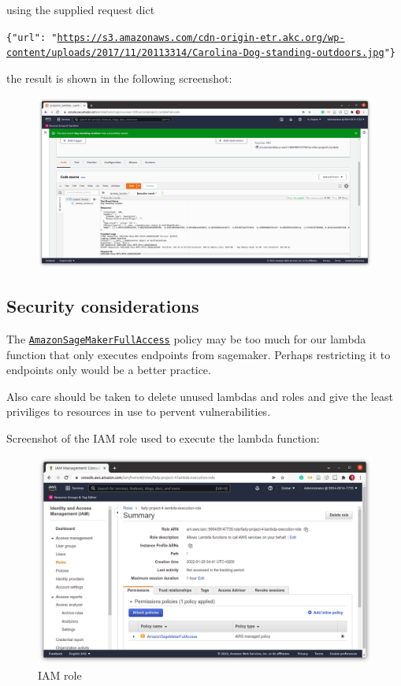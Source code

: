 \documentclass[a4paper
]{article}
\begin{document}
using the supplied request dict


\texttt{\{"url": "\url{https://s3.amazonaws.com/cdn-origin-etr.akc.org/wp-content/uploads/2017/11/20113314/Carolina-Dog-standing-outdoors.jpg}"\}}


the result is shown in the following screenshot:

\begin{figure}[H]
\centering
\includegraphics{../screenshots/04-a_lambda-function-testing.png}
\end{figure}

\hypertarget{security-considerations}{%
\subsection{Security considerations}\label{security-considerations}}

The
\href{https://console.aws.amazon.com/iam/home\#/policies/arn:aws:iam::aws:policy/AmazonSageMakerFullAccess}{\texttt{AmazonSageMakerFullAccess}}
policy may be too much for our lambda function that only executes
endpoints from sagemaker. Perhaps restricting it to endpoints only would
be a better practice.

Also care should be taken to delete unused lambdas and roles and give
the least priviliges to resources in use to pervent vulnerabilities.

Screenshot of the IAM role used to execute the lambda function:

\begin{figure}[H]
\centering
\includegraphics{../screenshots/04-b_IAM-role.png}
\caption{IAM role}
\end{figure}
\end{document}
